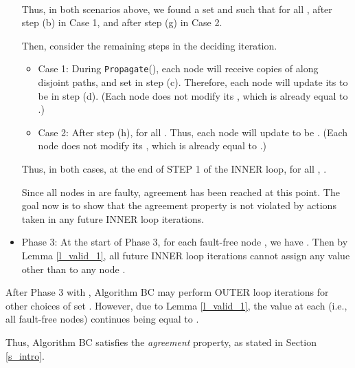 \documentclass[letterpaper, 11pt]{article}
\newenvironment{proof}{\noindent {\bf Proof:}~}{\hspace*{\fill}}
\newcommand{\Propagate}{{\tt Propagate}}
\begin{document}
\begin{proof}
\begin{itemize}
\begin{itemize}
\end{itemize}

Thus, in both scenarios above, we found a set  and  such that for all ,  after step (b) in Case 1, and after step (g) in Case 2.

Then, consider the remaining steps in the deciding iteration.

\begin{itemize}
\item Case 1: During \Propagate(), each node  will receive  copies of  along  disjoint paths, and set  in step (c). Therefore, each node  will update its  to be  in step (d).
(Each node  does not modify its , which is
already equal to .)

\item Case 2: After step (h),  for all . Thus, each node   will update  to be .
(Each node  does not modify its , which is
already equal to .)

\end{itemize}



Thus, in both cases, at the end of STEP 1 of the INNER loop, for
all , . 

Since all nodes in  are faulty, agreement has been reached at this
point.
The goal now is to show that the agreement
property is not violated by
actions taken in any future INNER loop iterations.

\item Phase 3: At the start of Phase 3, for each fault-free 
	node , we have .
	Then by Lemma \ref{l_valid_1}, all future INNER loop iterations cannot assign any value other than  to any node . 

\end{itemize}
After Phase 3 with , Algorithm BC may perform OUTER loop iterations for
other choices of set . However, due to Lemma \ref{l_valid_1},
the value  at each  (i.e., all fault-free nodes)
continues being equal to . 

Thus, Algorithm BC satisfies the {\em agreement} property, as stated
in Section \ref{s_intro}.
\end{proof}



 
 
 
\end{document}
